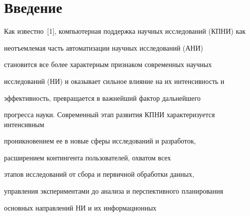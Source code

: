 

 










      \thispagestyle{headings}





      


            \label{st\stat}


            


            \vspace*{-24pt}





\section{Введение}





 Как известно~[1], компьютерная поддержка научных исследований (КПНИ) как


 неотъемлемая часть автоматизации научных исследований (АНИ)


 становится все более характерным признаком современных научных


 исследований (НИ) и оказывает сильное влияние на их интенсивность и


 эффективность, превращается в важнейший фактор дальнейшего


 прогресса науки. Современный этап развития КПНИ характеризуется  интенсивным


проникновением ее в новые сферы исследований и разработок,


расширением контингента пользователей, охватом всех


этапов исследований от сбора и первичной обработки данных,


управления экспериментами до анализа и перспективного планирования


основных направлений НИ и их информационных


